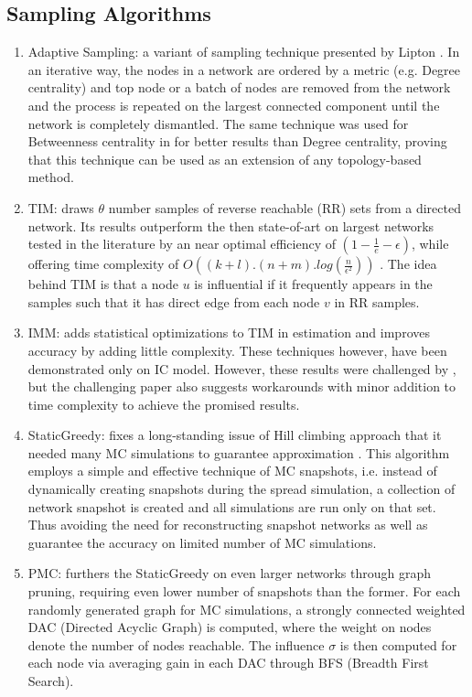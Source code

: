 		\subsection{Sampling Algorithms}
		\begin{enumerate}
			\item Adaptive Sampling: a variant of sampling technique presented by Lipton \cite{lipton1989}. In an iterative way, the nodes in a network are ordered by a metric (e.g. Degree centrality) and top node or a batch of nodes are removed from the network and the process is repeated on the largest connected component until the network is completely dismantled. The same technique was used for Betweenness centrality in \cite{hussain2019} for better results than Degree centrality, proving that this technique can be used as an extension of any topology-based method. 
			
			\item TIM: draws $\theta$ number samples of reverse reachable (RR) sets from a directed network. Its results outperform the then state-of-art on largest networks tested in the literature by an near optimal efficiency of $(1-\frac{1}{e}-\epsilon)$, while offering time complexity of $O((k+l).(n+m).log(\frac{n}{\epsilon^2}))$ \cite{tang2014}. The idea behind TIM is that a node $u$ is influential if it frequently appears in the samples such that it has direct edge from each node $v$ in RR samples. %
			
			\item IMM: \cite{tang2015} adds statistical optimizations to TIM in estimation and improves accuracy by adding little complexity. These techniques however, have been demonstrated only on IC model. However, these results were challenged by \cite{chen2018}, but the challenging paper also suggests workarounds with minor addition to time complexity to achieve the promised results.
			
			\item StaticGreedy: fixes a long-standing issue of Hill climbing approach that it needed many MC simulations to guarantee approximation \cite{cheng2013}. This algorithm employs a simple and effective technique of MC snapshots, i.e. instead of dynamically creating snapshots during the spread simulation, a collection of network snapshot is created and all simulations are run only on that set. Thus avoiding the need for reconstructing snapshot networks as well as guarantee the accuracy on limited number of MC simulations.
			
			\item PMC: \cite{ohsaka2014} furthers the StaticGreedy on even larger networks through graph pruning, requiring even lower number of snapshots than the former. For each randomly generated graph for MC simulations, a strongly connected weighted DAC (Directed Acyclic Graph) is computed, where the weight on nodes denote the number of nodes reachable. The influence $\sigma$ is then computed for each node via averaging gain in each DAC through BFS (Breadth First Search).
			
		\end{enumerate}
		
